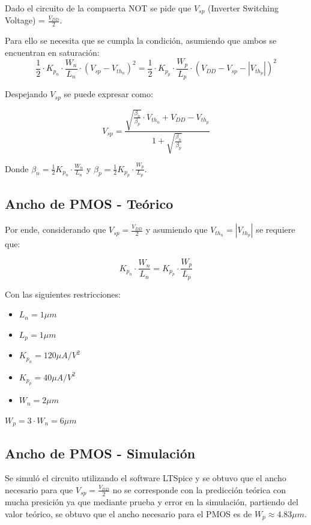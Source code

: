 Dado el circuito de la compuerta NOT se pide que $V_{sp}$ (Inverter Switching Voltage) = $\frac{V_{DD}}{2}$.

Para ello se necesita que se cumpla la condición, asumiendo que ambos se encuentran en saturación:
\begin{equation}
    \frac{1}{2} \cdot K_{p_n} \cdot \frac{W_n}{L_n} \cdot (V_{sp} - V_{th_n})^2 = \frac{1}{2} \cdot K_{p_p} \cdot \frac{W_p}{L_p} \cdot (V_{DD} - V_{sp} - |V_{th_p}|)^2
\end{equation}

Despejando $V_{sp}$ se puede expresar como:

\begin{equation}
    V_{sp} = \frac{\sqrt {\frac{\beta_n}{\beta_p}}\cdot V_{th_n} + V_{DD} - V_{th_p}}{1+\sqrt{\frac{\beta_n}{\beta_p}}}
\end{equation}

Donde $\beta_n = \frac{1}{2}K_{p_n} \cdot \frac{W_n}{L_n}$ y $\beta_p = \frac{1}{2}K_{p_p} \cdot \frac{W_p}{L_p}$.

\subsection{Ancho de PMOS - Teórico}

Por ende, considerando que $V_{sp} = \frac{V_{DD}}{2}$ y asumiendo que $V_{th_n} = |V_{th_p}|$ se requiere que:

\begin{equation}
    K_{p_n}\cdot \frac{W_n}{L_n} = K_{p_p} \cdot \frac{W_p}{L_p}
\end{equation}

Con las siguientes restricciones:
\begin{itemize}
    \item $L_n = 1 \mu m$
    \item $L_p = 1 \mu m$
    \item $K_{p_n} = 120 \mu A/V^2$
    \item $K_{p_p} = 40 \mu A/V^2$
    \item $W_n = 2 \mu m$
\end{itemize}

$ W_p = 3\cdot W_n = 6 \mu m $

\subsection{Ancho de PMOS - Simulación}

Se simuló el circuito utilizando el software LTSpice y se obtuvo que el ancho necesario para que $V_{sp} = \frac{V_{DD}}{2}$ no 
se corresponde con la predicción teórica con mucha presición ya que mediante prueba y error en la simulación, partiendo del valor
teórico, se obtuvo que el ancho necesario para el PMOS es de $W_p \approx 4.83 \mu m$.

